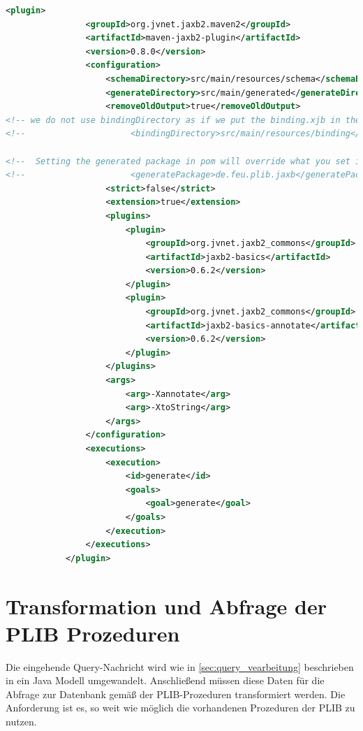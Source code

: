 \begin{lstlisting}[caption=JAXB Maven Plugin, language=XML, label=lst:jaxbplugin]
            <plugin>
                <groupId>org.jvnet.jaxb2.maven2</groupId>
                <artifactId>maven-jaxb2-plugin</artifactId>
                <version>0.8.0</version>
                <configuration>
                    <schemaDirectory>src/main/resources/schema</schemaDirectory>
                    <generateDirectory>src/main/generated</generateDirectory>
                    <removeOldOutput>true</removeOldOutput>
<!-- we do not use bindingDirectory as if we put the binding.xjb in the schema directory it will be taken -->
<!--                     <bindingDirectory>src/main/resources/binding</bindingDirectory> -->

<!--  Setting the generated package in pom will override what you set in binding.xjb file, thus commented out -->
<!--                     <generatePackage>de.feu.plib.jaxb</generatePackage> -->
                    <strict>false</strict>
                    <extension>true</extension>
                    <plugins>
                        <plugin>
                            <groupId>org.jvnet.jaxb2_commons</groupId>
                            <artifactId>jaxb2-basics</artifactId>
                            <version>0.6.2</version>
                        </plugin>
                        <plugin>
                            <groupId>org.jvnet.jaxb2_commons</groupId>
                            <artifactId>jaxb2-basics-annotate</artifactId>
                            <version>0.6.2</version>
                        </plugin>
                    </plugins>
                    <args>
                        <arg>-Xannotate</arg>
                        <arg>-XtoString</arg>
                    </args>
                </configuration>
                <executions>
                    <execution>
                        <id>generate</id>
                        <goals>
                            <goal>generate</goal>
                        </goals>
                    </execution>
                </executions>
            </plugin>    
\end{lstlisting}

\section{Transformation und Abfrage der PLIB Prozeduren}\label{sec:abfrage_plib_prozeduren}

Die eingehende Query-Nachricht wird wie in \autoref{sec:query_vearbeitung} beschrieben in ein Java Modell umgewandelt. Anschließend müssen diese Daten für die Abfrage zur Datenbank gemäß der PLIB-Prozeduren transformiert werden. Die Anforderung ist es, so weit wie möglich die vorhandenen Prozeduren der PLIB zu nutzen. 

